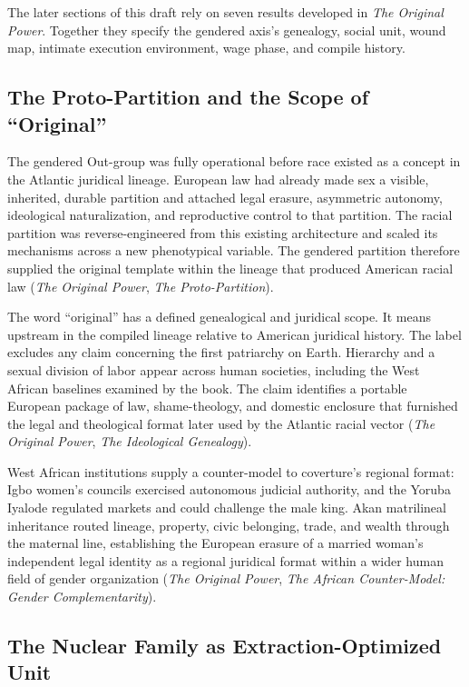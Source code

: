 \documentclass[12pt]{article}
\newcommand{\OP}{\textit{The Original Power}}
\begin{document}
The later sections of this draft rely on seven results developed in \OP{}. Together they specify the gendered axis's genealogy, social unit, wound map, intimate execution environment, wage phase, and compile history.

\subsection{The Proto-Partition and the Scope of “Original”}

The gendered Out-group was fully operational before race existed as a concept in the Atlantic juridical lineage. European law had already made sex a visible, inherited, durable partition and attached legal erasure, asymmetric autonomy, ideological naturalization, and reproductive control to that partition. The racial partition was reverse-engineered from this existing architecture and scaled its mechanisms across a new phenotypical variable. The gendered partition therefore supplied the original template within the lineage that produced American racial law (\OP{}, \textit{The Proto-Partition}).

The word “original” has a defined genealogical and juridical scope. It means upstream in the compiled lineage relative to American juridical history. The label excludes any claim concerning the first patriarchy on Earth. Hierarchy and a sexual division of labor appear across human societies, including the West African baselines examined by the book. The claim identifies a portable European package of law, shame-theology, and domestic enclosure that furnished the legal and theological format later used by the Atlantic racial vector (\OP{}, \textit{The Ideological Genealogy}).

West African institutions supply a counter-model to coverture's regional format: Igbo women's councils exercised autonomous judicial authority, and the Yoruba Iyalode regulated markets and could challenge the male king. Akan matrilineal inheritance routed lineage, property, civic belonging, trade, and wealth through the maternal line, establishing the European erasure of a married woman's independent legal identity as a regional juridical format within a wider human field of gender organization (\OP{}, \textit{The African Counter-Model: Gender Complementarity}).

\subsection{The Nuclear Family as Extraction-Optimized Unit}
\end{document}
